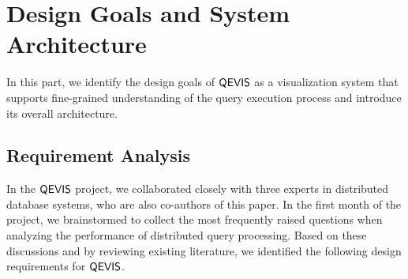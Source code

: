 \section{Design Goals and System Architecture}\label{sec:systemdesign}

In this part, we identify the design goals of $\mathsf{QEVIS}$ as a visualization system that supports fine-grained understanding of the query execution process and introduce its overall architecture.   


\subsection{Requirement Analysis}
%

In the $\mathsf{QEVIS}$ project, we collaborated closely with three experts in distributed database systems, who are also co-authors of this paper. In the first month of the project, we brainstormed to collect the most frequently raised questions when analyzing the performance of distributed query processing. Based on these discussions and by reviewing existing literature, we identified the following design requirements for $\mathsf{QEVIS}$.

